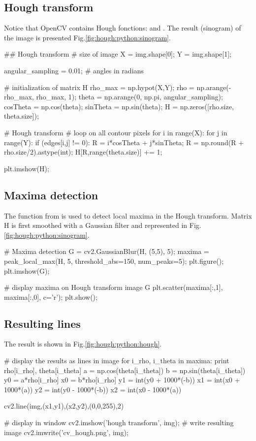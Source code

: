 \subsection{Hough transform}
Notice that OpenCV contains Hough fonctions:  and . The result (sinogram) of the image is presented Fig.\ref{fig:hough:python:sinogram}.


\begin{python}
## Hough transform
# size of image
X = img.shape[0];
Y = img.shape[1];

angular_sampling = 0.01; # angles in radians

# initialization of matrix H
rho_max = np.hypot(X,Y);
rho = np.arange(-rho_max, rho_max, 1);
theta = np.arange(0, np.pi, angular_sampling);
cosTheta = np.cos(theta);
sinTheta = np.sin(theta);
H = np.zeros([rho.size, theta.size]);

# Hough transform
# loop on all contour pixels
for i in range(X):
    for j in range(Y):
        if (edges[i,j] != 0):
            R = i*cosTheta + j*sinTheta;
            R = np.round(R + rho.size/2).astype(int);
            H[R,range(theta.size)] += 1;

plt.imshow(H);
\end{python}

\subsection{Maxima detection}
The function  from  is used to detect local maxima in the Hough transform. Matrix H is first smoothed with a Gaussian filter and represented in Fig.\ref{fig:hough:python:sinogram}.
\begin{python}
# Maxima detection
G = cv2.GaussianBlur(H, (5,5), 5);
maxima = peak_local_max(H, 5, threshold_abs=150, num_peaks=5);
plt.figure();
plt.imshow(G);

# display maxima on Hough transform image G
plt.scatter(maxima[:,1], maxima[:,0], c='r');
plt.show();
\end{python}

\subsection{Resulting lines}
The result is shown in Fig.\ref{fig:hough:python:hough}.
\begin{python}
# display the results as lines in image
for i_rho, i_theta in maxima:
    print rho[i_rho], theta[i_theta]
    a = np.cos(theta[i_theta])
    b = np.sin(theta[i_theta])
    y0 = a*rho[i_rho]
    x0 = b*rho[i_rho]
    y1 = int(y0 + 1000*(-b))
    x1 = int(x0 + 1000*(a))
    y2 = int(y0 - 1000*(-b))
    x2 = int(x0 - 1000*(a))
    
    cv2.line(img,(x1,y1),(x2,y2),(0,0,255),2)

# display in window
cv2.imshow('hough transform', img);
# write resulting image
cv2.imwrite('cv_hough.png', img);
\end{python}

